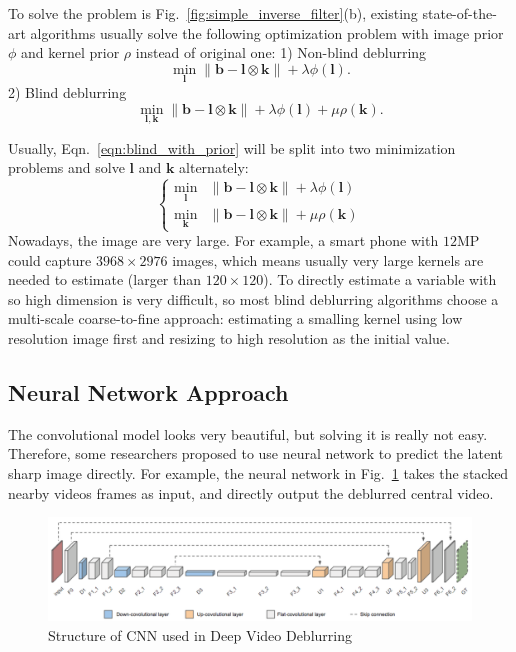\documentclass[journal, onecolumn, 10pt]{IEEEtran}
\begin{document}
To solve the problem is Fig.~\ref*{fig:simple_inverse_filter}(b), existing state-of-the-art algorithms usually solve the following optimization problem with image prior $\phi$ and kernel prior $\rho$ instead of original one: 1) Non-blind deblurring
\begin{equation}
\min_{\mathbf{l}} \| \mathbf{b} - \mathbf{l} \otimes \mathbf{k} \| + \lambda\phi(\mathbf{l}).
\label{eqn:non_blind_with_prior}
\end{equation}
2) Blind deblurring
\begin{equation}
\min_{\mathbf{l}, \mathbf{k}} \| \mathbf{b} - \mathbf{l} \otimes \mathbf{k} \| + \lambda\phi(\mathbf{l}) + \mu \rho(\mathbf{k}).
\label{eqn:blind_with_prior}
\end{equation}

Usually, Eqn.~\ref{eqn:blind_with_prior} will be split into two minimization problems and solve  $\mathbf{l}$ and $\mathbf{k}$ alternately:
\begin{equation}
\begin{cases}
\min_{\mathbf{l}}&\| \mathbf{b} - \mathbf{l} \otimes \mathbf{k} \| + \lambda\phi(\mathbf{l}) \\
\min_{\mathbf{k}}&\| \mathbf{b} - \mathbf{l} \otimes \mathbf{k} \| + \mu \rho(\mathbf{k})
\end{cases}
\label{eqn:blind_with_prior_alternate}
\end{equation}
Nowadays, the image are very large. For example, a smart phone with $12$MP could capture $3968 \times 2976$ images, which means usually very large kernels are needed to estimate (larger than $120 \times 120$). To directly estimate a variable with so high dimension is very difficult, so most blind deblurring algorithms choose a multi-scale coarse-to-fine approach: estimating a smalling kernel using low resolution image first and resizing to high resolution as the initial value.


\subsection{Neural Network Approach}
The convolutional model looks very beautiful, but solving it is really not easy. Therefore, some researchers proposed to use neural network to predict the latent sharp image directly. For example, the neural network in Fig.~\ref{fig:deep_video_deblurring_cnn} takes the stacked nearby videos frames as input, and directly output the deblurred central video. 

\begin{figure}[h!]
\centering
\includegraphics[width = 1\textwidth]{pic/deep_video_deblurring_cnn.png}
\caption{Structure of CNN used in Deep Video Deblurring\cite{su2016deep}}
\label{fig:deep_video_deblurring_cnn}
\end{figure}
\end{document}
